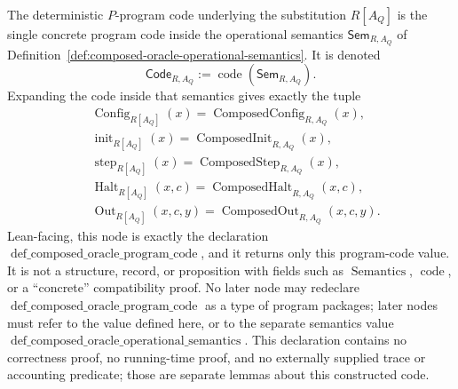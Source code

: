\begin{definition}
  \label{def:composed-oracle-program-code}
  The deterministic $P$-program code underlying the substitution
  $R[A_Q]$ is the single concrete program code inside the operational semantics
  $\mathsf{Sem}_{R,A_Q}$ of
  Definition~\ref{def:composed-oracle-operational-semantics}.  It is denoted
  \[
    \mathsf{Code}_{R,A_Q}
    :=\operatorname{code}(\mathsf{Sem}_{R,A_Q}).
  \]
  Expanding the code inside that semantics gives exactly the tuple
  \[
  \begin{aligned}
    &\operatorname{Config}_{R[A_Q]}(x)
      =\operatorname{ComposedConfig}_{R,A_Q}(x),\\
    &\operatorname{init}_{R[A_Q]}(x)
      =\operatorname{ComposedInit}_{R,A_Q}(x),\\
    &\operatorname{step}_{R[A_Q]}(x)
      =\operatorname{ComposedStep}_{R,A_Q}(x),\\
    &\operatorname{Halt}_{R[A_Q]}(x,c)
      =\operatorname{ComposedHalt}_{R,A_Q}(x,c),\\
    &\operatorname{Out}_{R[A_Q]}(x,c,y)
      =\operatorname{ComposedOut}_{R,A_Q}(x,c,y).
  \end{aligned}
  \]
  Lean-facing, this node is exactly the declaration
  $\operatorname{def\_composed\_oracle\_program\_code}$, and it returns only
  this program-code value.  It is not a structure, record, or proposition with
  fields such as $\operatorname{Semantics}$, $\operatorname{code}$, or a
  ``concrete'' compatibility proof.  No later node may redeclare
  $\operatorname{def\_composed\_oracle\_program\_code}$ as a type of program
  packages; later nodes must refer to the value defined here, or to the
  separate semantics value
  $\operatorname{def\_composed\_oracle\_operational\_semantics}$.
  This declaration contains no correctness proof, no running-time proof, and
  no externally supplied trace or accounting predicate; those are separate
  lemmas about this constructed code.
\end{definition}


